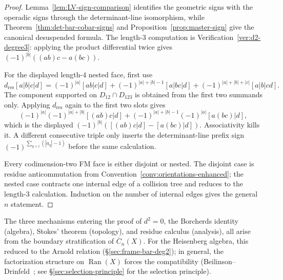 \begin{proof}
Lemma~\ref{lem:LV-sign-comparison} identifies the geometric signs with
the operadic signs through the determinant-line isomorphism, while
Theorem~\ref{thm:det-bar-cobar-signs} and
Proposition~\ref{prop:master-sign} give the canonical desuspended
formula. The length-$3$ computation is
Verification~\ref{ver:d2-degree3}: applying the product differential
twice gives
$(-1)^{|b|}((ab)c-a(bc))$.

For the displayed length-$4$ nested face, first use
\[
d_{\mathrm{res}}[a|b|c|d]
=(-1)^{|a|}[ab|c|d]
 +(-1)^{|a|+|b|-1}[a|bc|d]
 +(-1)^{|a|+|b|+|c|}[a|b|cd].
\]
The component supported on $D_{12}\cap D_{123}$ is obtained from the
first two summands only. Applying $d_{\mathrm{res}}$ again to the first
two slots gives
\[
(-1)^{|a|}(-1)^{|a|+|b|}[(ab)c|d]
 +(-1)^{|a|+|b|-1}(-1)^{|a|}[a(bc)|d],
\]
which is the displayed
$(-1)^{|b|}([(ab)c|d]-[a(bc)|d])$. Associativity kills it. A different
consecutive triple only inserts the determinant-line prefix sign
$(-1)^{\sum_{q<i}(|a_q|-1)}$ before the same calculation.

Every codimension-two FM face is either disjoint or nested. The
disjoint case is residue anticommutation from
Convention~\ref{conv:orientations-enhanced}; the nested case contracts
one internal edge of a collision tree and reduces to the length-$3$
calculation. Induction on the number of internal edges gives the
general $n$ statement.
\end{proof}

\begin{remark}\label{rem:d-squared-synthesis}\label{rem:geometric-miracle}
The three mechanisms entering the proof of $d^2 = 0$,
the Borcherds identity (algebra), Stokes' theorem (topology), and
residue calculus (analysis), all arise from the boundary
stratification of $\overline{C}_n(X)$. For the Heisenberg algebra,
this reduced to the Arnold relation
(\S\ref{sec:frame-bar-deg2}); in general, the factorization structure
on $\operatorname{Ran}(X)$ forces the compatibility
(Beilinson--Drinfeld~\cite{BD04};
see \S\ref{sec:selection-principle} for the selection principle).
\end{remark}

